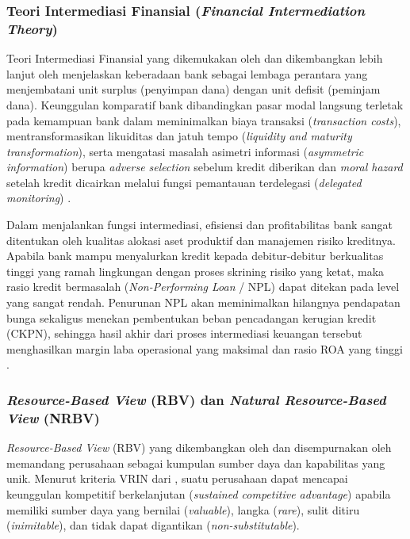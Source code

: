 \documentclass[12pt,a4paper]{article}
\numberwithin{equation}{section}
\begin{document}
\subsubsection{Teori Intermediasi Finansial (\emph{Financial Intermediation Theory})}
\noindent
Teori Intermediasi Finansial yang dikemukakan oleh \citet{GurleyShaw1960} dan dikembangkan lebih lanjut oleh \citet{Diamond1984} menjelaskan keberadaan bank sebagai lembaga perantara yang menjembatani unit surplus (penyimpan dana) dengan unit defisit (peminjam dana). Keunggulan komparatif bank dibandingkan pasar modal langsung terletak pada kemampuan bank dalam meminimalkan biaya transaksi (\emph{transaction costs}), mentransformasikan likuiditas dan jatuh tempo (\emph{liquidity and maturity transformation}), serta mengatasi masalah asimetri informasi (\emph{asymmetric information}) berupa \emph{adverse selection} sebelum kredit diberikan dan \emph{moral hazard} setelah kredit dicairkan melalui fungsi pemantauan terdelegasi (\emph{delegated monitoring}) \citep{Diamond1984, KuncoroSuhardjono2018}.

\noindent
Dalam menjalankan fungsi intermediasi, efisiensi dan profitabilitas bank sangat ditentukan oleh kualitas alokasi aset produktif dan manajemen risiko kreditnya. Apabila bank mampu menyalurkan kredit kepada debitur-debitur berkualitas tinggi yang ramah lingkungan dengan proses skrining risiko yang ketat, maka rasio kredit bermasalah (\emph{Non-Performing Loan} / NPL) dapat ditekan pada level yang sangat rendah. Penurunan NPL akan meminimalkan hilangnya pendapatan bunga sekaligus menekan pembentukan beban pencadangan kerugian kredit (CKPN), sehingga hasil akhir dari proses intermediasi keuangan tersebut menghasilkan margin laba operasional yang maksimal dan rasio ROA yang tinggi \citep{Fachrudin2021, Dendawijaya2015}.

\subsubsection{\emph{Resource-Based View} (RBV) dan \emph{Natural Resource-Based View} (NRBV)}
\noindent
\emph{Resource-Based View} (RBV) yang dikembangkan oleh \citet{Wernerfelt1984} dan disempurnakan oleh \citet{Barney1991} memandang perusahaan sebagai kumpulan sumber daya dan kapabilitas yang unik. Menurut kriteria VRIN dari \citet{Barney1991}, suatu perusahaan dapat mencapai keunggulan kompetitif berkelanjutan (\emph{sustained competitive advantage}) apabila memiliki sumber daya yang bernilai (\emph{valuable}), langka (\emph{rare}), sulit ditiru (\emph{inimitable}), dan tidak dapat digantikan (\emph{non-substitutable}).
\end{document}
